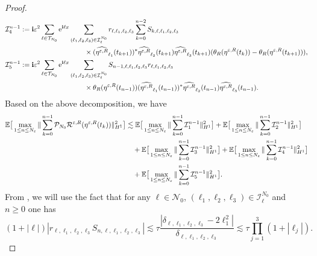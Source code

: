 \documentclass[a4paper]{amsart}
\begin{document}
\begin{proof}
\begin{align*}
    &\mathcal{I}_4^{n-1}:={\bf i}\varepsilon^2 \sum_{\ell\in\mathcal{T}_{N_0}}{\rm e}^{{\bf i}\ell x}\sum_{(\ell_1,\ell_2,\ell_3)\in\mathcal{I}_{\ell}^{N_0}}
    r_{\ell,\ell_1,\ell_2,\ell_3}\sum_{k=0}^{n-2}S_{k,\ell,\ell_1,\ell_2,\ell_3}\\
    &\hspace{4cm}\times (\widehat{\eta^{\varepsilon,R}}_{\ell_1}(t_{k+1}))^*\widehat{\eta^{\varepsilon,R}}_{\ell_2}(t_{k+1})\widehat{\eta^{\varepsilon,R}}_{\ell_3}(t_{k+1})(\theta_R(\eta^{\varepsilon,R}(t_k))-\theta_R(\eta^{\varepsilon,R}(t_{k+1}))),\\ 
    &\mathcal{I}_5^{n-1}:={\bf i}\varepsilon^2 \sum_{\ell\in\mathcal{T}_{N_0}}{\rm e}^{{\bf i}\ell x}\sum_{(\ell_1,\ell_2,\ell_3)\in\mathcal{I}_{\ell}^{N_0}}
    S_{n-1,\ell,\ell_1,\ell_2,\ell_3}r_{\ell,\ell_1,\ell_2,\ell_3}\\
    &\hspace{4cm}\times \theta_R(\eta^{\varepsilon,R}(t_{n-1}))(\widehat{\eta^{\varepsilon,R}}_{\ell_1}(t_{n-1}))^*\widehat{\eta^{\varepsilon,R}}_{\ell_2}(t_{n-1}) \widehat{\eta^{\varepsilon,R}}_{\ell_3}(t_{n-1}).
\end{align*}
Based on the above decomposition, we have
\begin{align}
    \mathbb{E}\big[\max_{1\le n\le N_\varepsilon}\|\sum_{k=0}^{n-1}\mathcal{P}_{N_0}\mathcal{R}^{\varepsilon,R}(\eta^{\varepsilon,R}(t_k))\|^{2}_{H^1}\big]&\lesssim \mathbb{E}\big[\max_{1\le n\le N_\varepsilon}\|\sum_{k=0}^{n-1}\mathcal{I}_{1}^{n-1}\|^{2}_{H^1}\big]+\mathbb{E}\big[\max_{1\le n\le N_\varepsilon}\|\sum_{k=0}^{n-1}\mathcal{I}_{2}^{n-1}\|^{2}_{H^1}\big]\notag \\
    &\quad + \mathbb{E}\big[\max_{1\le n\le N_\varepsilon}\|\sum_{k=0}^{n-1}\mathcal{I}_{3}^{n-1}\|^{2}_{H^1}\big]+\mathbb{E}\big[\max_{1\le n\le N_\varepsilon}\|\sum_{k=0}^{n-1}\mathcal{I}_{4}^{n-1}\|^{2}_{H^1}\big]\notag \\
    &\quad +\mathbb{E}\big[\max_{1\le n\le N_\varepsilon}\|\sum_{k=0}^{n-1}\mathcal{I}_{5}^{n-1}\|^{2}_{H^1}\big] \label{start_dec}.
\end{align}
From \cite{fe_ka}, we will use the fact that for any $\ell\in\mathcal{N_0}$, $(\ell_1,\ell_2,\ell_3)\in\mathcal{I}_{\ell}^{N_0}$ and $n\ge 0$ one has
\begin{equation}
    \label{b_fe0}
   (1+|\ell|) |r_{\ell,\ell_1,\ell_2,\ell_3} S_{n,\ell,\ell_1,\ell_2,\ell_3}|\lesssim \tau \frac{|\delta_{\ell,\ell_1,\ell_2,\ell_3}-2\ell_1^2|}{\delta_{\ell,\ell_1,\ell_2,\ell_3}} \lesssim \tau \prod_{j=1}^{3}(1+|\ell_j|).

\end{equation}
\end{proof}
\end{document}
